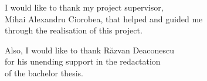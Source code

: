 \vspace*{7cm}
\begin{center}
I would like to thank my project supervisor,\\
Mihai Alexandru Ciorobea, that helped and guided me\\
through the realisation of this project.\\
\end{center}
\vspace{0.6cm}
\begin{center}
Also, I would like to thank Răzvan Deaconescu\\
for his unending support in the redactation\\
of the bachelor thesis.\\
\end{center}
